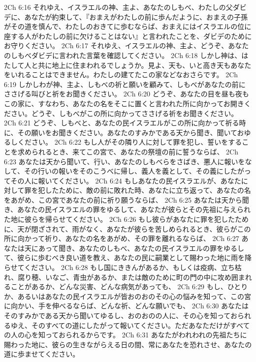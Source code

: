 2Ch 6:16  それゆえ、イスラエルの神、主よ、あなたのしもべ、わたしの父ダビデに、あなたが約束して、『おまえがわたしの前に歩んだように、おまえの子孫がその道を慎んで、わたしのおきてに歩むならば、おまえにはイスラエルの位に座する人がわたしの前に欠けることはない』と言われたことを、ダビデのためにお守りください。
2Ch 6:17  それゆえ、イスラエルの神、主よ、どうぞ、あなたのしもべダビデに言われた言葉を確認してください。
2Ch 6:18  しかし神は、はたして人と共に地上に住まわれるでしょうか。見よ、天も、いと高き天もあなたをいれることはできません。わたしの建てたこの家などなおさらです。
2Ch 6:19  しかしわが神、主よ、しもべの祈と願いを顧みて、しもべがあなたの前にささげる叫びと祈をお聞きください。
2Ch 6:20  どうぞ、あなたの目を昼も夜もこの家に、すなわち、あなたの名をそこに置くと言われた所に向かってお開きください。どうぞ、しもべがこの所に向かってささげる祈をお聞きください。
2Ch 6:21  どうぞ、しもべと、あなたの民イスラエルがこの所に向かって祈る時に、その願いをお聞きください。あなたのすみかである天から聞き、聞いておゆるしください。
2Ch 6:22  もし人がその隣り人に対して罪を犯し、誓いをすることを求められるとき、来てこの宮で、あなたの祭壇の前に誓うならば、
2Ch 6:23  あなたは天から聞いて、行い、あなたのしもべらをさばき、悪人に報いをなして、その行いの報いをそのこうべに帰し、義人を義として、その義にしたがってその人に報いてください。
2Ch 6:24  もしあなたの民イスラエルが、あなたに対して罪を犯したために、敵の前に敗れた時、あなたに立ち返って、あなたの名をあがめ、この宮であなたの前に祈り願うならば、
2Ch 6:25  あなたは天から聞き、あなたの民イスラエルの罪をゆるして、あなたが彼らとその先祖に与えられた地に彼らを帰らせてください。
2Ch 6:26  もし彼らがあなたに罪を犯したために、天が閉ざされて、雨がなく、あなたが彼らを苦しめられるとき、彼らがこの所に向かって祈り、あなたの名をあがめ、その罪を離れるならば、
2Ch 6:27  あなたは天にあって聞き、あなたのしもべ、あなたの民イスラエルの罪をゆるして、彼らに歩むべき良い道を教え、あなたの民に嗣業として賜わった地に雨を降らせてください。
2Ch 6:28  もし国にききんがあるか、もしくは疫病、立ち枯れ、腐り穂、いなご、青虫があるか、または敵のために町の門の中に攻め囲まれることがあるか、どんな災害、どんな病気があっても、
2Ch 6:29  もし、ひとりか、あるいはあなたの民イスラエルが皆おのおのその心の悩みを知って、この宮に向かい、手を伸べるならば、どんな祈、どんな願いでも、
2Ch 6:30  あなたはそのすみかである天から聞いてゆるし、おのおのの人に、その心を知っておられるゆえ、そのすべての道にしたがって報いてください。ただあなただけがすべての人の心を知っておられるからです。
2Ch 6:31  あなたがわれわれの先祖たちに賜わった地に、彼らの生きながらえる日の間、常にあなたを恐れさせ、あなたの道に歩ませてください。
